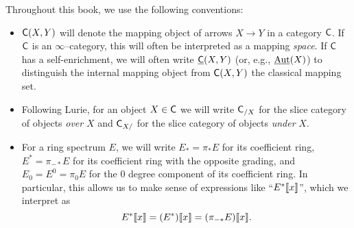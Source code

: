 
Throughout this book, we use the following conventions:

\begin{itemize}
\item $\mathsf{C}(X, Y)$ will denote the mapping object of arrows $X \to Y$ in a category $\mathsf{C}$.  If $\mathsf{C}$ is an $\infty$--category, this will often be interpreted as a mapping \emph{space}.  If $\mathsf{C}$ has a self-enrichment, we will often write $\underline{\mathsf{C}}(X, Y)$ (or, e.g., $\operatorname{\underline{\smash{\operatorname{Aut}}}}(X)$) to distinguish the internal mapping object from $\mathsf{C}(X, Y)$ the classical mapping set.
\item Following Lurie, for an object $X \in \mathsf{C}$ we will write $\mathsf{C}_{/X}$ for the slice category of objects \emph{over} $X$ and $\mathsf{C}_{X/}$ for the slice category of objects \emph{under} $X$.
\item For a ring spectrum $E$, we will write $E_* = \pi_* E$ for its coefficient ring, $E^* = \pi_{-*} E$ for its coefficient ring with the opposite grading, and $E_0 = E^0 = \pi_0 E$ for the $0${\th} degree component of its coefficient ring.  In particular, this allows us to make sense of expressions like ``$E^*\llbracket{x}\rrbracket$'', which we interpret as \[E^*\llbracket{x}\rrbracket = (E^*)\llbracket{x}\rrbracket = (\pi_{-*} E)\llbracket{x}\rrbracket.\]
\end{itemize}
